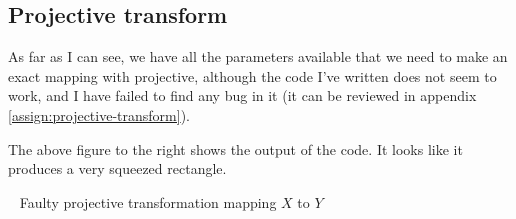 \newpage
\subsection{Projective transform}
\begin{multicols}{2}
    As far as I can see, we have all the parameters available that we need to
    make an exact mapping with projective, although the code I've written does
    not seem to work, and I have failed to find any bug in it (it can be
    reviewed in appendix \ref{assign:projective-transform}).

    The above figure to the right shows the output of the code. It looks like
    it produces a very squeezed rectangle.

    \vfill{\ }\columnbreak
    {Faulty projective transformation mapping $X$ to $Y$}
\end{multicols}

